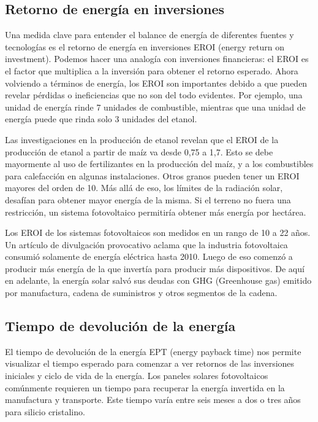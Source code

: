 \documentclass[runningheads]{llncs}
\begin{document}
\subsection{Retorno de energía en inversiones}
\bigskip
Una medida clave para entender el balance de energía de diferentes fuentes y tecnologías es el retorno de energía en inversiones EROI (energy return on investment). Podemos hacer una analogía con inversiones financieras: el EROI es el factor que multiplica a la inversión para obtener el retorno esperado. Ahora volviendo a términos de energía, los EROI son importantes debido a que pueden revelar pérdidas o ineficiencias que no son del todo evidentes. Por ejemplo, una unidad de energía rinde 7 unidades de combustible, mientras que una unidad de energía puede que rinda solo 3 unidades del etanol.

\bigskip
Las investigaciones en la producción de etanol revelan que el EROI de la producción de etanol a partir de maíz va desde 0,75 a 1,7. Esto se debe mayormente al uso de fertilizantes en la producción del maíz, y a los combustibles para calefacción en algunas instalaciones. Otros granos pueden tener un EROI mayores del orden de 10. Más allá de eso, los límites de la radiación solar, desafían para obtener mayor energía de la misma. Si el terreno no fuera una restricción, un sistema fotovoltaico permitiría obtener más energía por hectárea.

\bigskip
Los EROI de los sistemas fotovoltaicos son medidos en un rango de 10 a 22 años. Un artículo de divulgación provocativo aclama que la industria fotovoltaica consumió solamente de energía eléctrica hasta 2010. Luego de eso comenzó a producir más energía de la que invertía para producir más dispositivos. De aquí en adelante, la energía solar salvó sus deudas con GHG (Greenhouse gas) emitido por manufactura, cadena de suministros y otros segmentos de la cadena.

\subsection{Tiempo de devolución de la energía}

\bigskip
El tiempo de devolución de la energía EPT (energy payback time) nos permite visualizar el tiempo esperado para comenzar a ver retornos de las inversiones iniciales y ciclo de vida de la energía. Los paneles solares fotovoltaicos comúnmente requieren un tiempo para recuperar la energía invertida en la manufactura y transporte. Este tiempo varía entre seis meses a dos o tres años para silicio cristalino.
\end{document}
